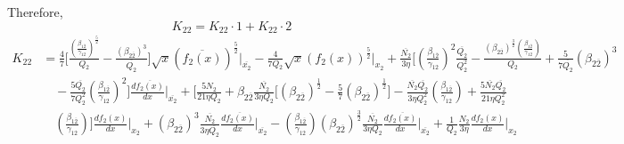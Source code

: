 \documentclass[fleqn, 10pt]{article}
\begin{document}
            Therefore, 
            \begin{equation*}
            K_{22} = K_{22} \cdot 1 + K_{22} \cdot 2
            \end{equation*}
            \begin{equation}
            \begin{split}
            K_{22} &= \frac{4}{7} \biggl[ \frac{\left(\frac{\beta_{1\overline{2}}}{\gamma_{12}}\right)^\frac{5}{2}}{Q_{2}} - \frac{\left(\beta_{2\overline{2}}\right)^{3}}{\overline{Q_{2}}}   \biggr] \sqrt{x}  (\overline{f_{2}(x)})^\frac{5}{2} \Bigg|_{\overline{x_{2}}} -   \frac{4}{7 Q_{2}} \sqrt{x} (f_{2}(x))^\frac{5}{2} \Bigg|_{x_{2}}+ \frac{\overline{N_{2}}}{3 \eta} \biggl[ \left(\frac{\beta_{1\overline{2}}}{\gamma_{12}}\right)^{2} \frac{\overline{Q_{2}}}{Q_{2}^{2}} - \frac{(\beta_{2\overline{2}})^\frac{3}{2} \left(\frac{\beta_{1\overline{2}}}{\gamma_{12}}\right)}{Q_{2}} + \frac{5}{7 \overline{Q_{2}}} (\beta_{2\overline{2}})^{3} \\ & \quad - \frac{5 \overline{Q_{2}}}{7 Q_{2}^{2}} \left(\frac{\beta_{1\overline{2}}}{\gamma_{12}}\right)^{2}   \biggr] \frac{d\overline{f_{2}(x)}}{dx} \Bigg|_{\overline{x_{2}}} + \biggl[ \frac{5 N_{2}}{21 \eta Q_{2}} + \beta_{2\overline{2}} \frac{\overline{N_{2}}}{3 \eta Q_{2}} \biggl[ (\beta_{2\overline{2}})^\frac{1}{2} - \frac{5}{7} (\beta_{2\overline{2}})^\frac{1}{2} \biggr] - \frac{\overline{N_{2}} \overline{Q_{2}}}{3 \eta Q_{2}^{2}} \left(\frac{\beta_{1\overline{2}}}{\gamma_{12}}\right)  + \frac{5 \overline{N_{2}} \overline{Q_{2}}}{21 \eta Q_{2}^{2}} \\ & \quad \left(\frac{\beta_{1\overline{2}}}{\gamma_{12}}\right)   \biggr] \frac{df_{2}(x)}{dx} \Bigg|_{x_{2}} + (\beta_{2\overline{2}})^3\frac{\overline{N_2}}{3 \eta \overline{Q_2} }   \frac{d\overline{f_2(x)}}{dx} \Bigg|_{\overline{x_2}} -   \left(\frac{\beta_{1\overline{2}}}{\gamma_{12}}\right) (\beta_{2\overline{2}})^\frac{3}{2}\frac{\overline{N_2}}{3 \eta Q_2} \frac{d \overline{f_2(x)}}{dx} \Bigg|_{\overline{x_2}} +   \frac{1}{Q_2} \frac{N_2}{3\eta} \frac{df_2(x)}{dx} \Bigg|_{x_2} 
            \end{split}
            \label{54}
            \end{equation}
\end{document}
